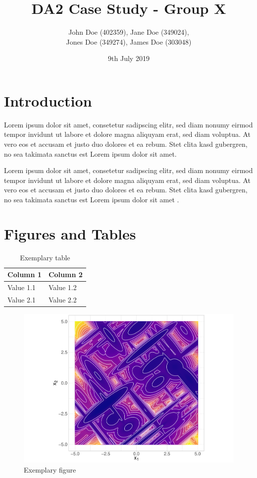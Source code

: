 \documentclass[12pt]{article}
\title{DA2 Case Study - Group X}
\author{John Doe (402359), Jane Doe (349024),\\ Jones Doe (349274), James Doe (303048)}
\date{9th July 2019}
\begin{document}
\maketitle

\section{Introduction}
Lorem ipsum dolor sit amet, consetetur sadipscing elitr, sed diam nonumy eirmod tempor invidunt ut labore et dolore magna aliquyam erat, sed diam voluptua. At vero eos et accusam et justo duo dolores et ea rebum. Stet clita kasd gubergren, no sea takimata sanctus est Lorem ipsum dolor sit amet.

Lorem ipsum dolor sit amet, consetetur sadipscing elitr, sed diam nonumy eirmod tempor invidunt ut labore et dolore magna aliquyam erat, sed diam voluptua. At vero eos et accusam et justo duo dolores et ea rebum. Stet clita kasd gubergren, no sea takimata sanctus est Lorem ipsum dolor sit amet \cite{eiben2015intro}.

\section{Figures and Tables}

\begin{table}[h!]
    \centering
    \begin{tabular}{@{}p{}p{}@{}}
        \hline
		{\bf Column 1} & {\bf Column 2}\\ \hline
         Value 1.1 &  Value 1.2\\
         Value 2.1 & Value 2.2 \\
         \hline
    \end{tabular}
    \caption{Exemplary table}
    \label{tab:exp_table}
\end{table}

\begin{figure}[h!]
    \centering
    \includegraphics[width=1\textwidth]{figures/example_figure.pdf}
    \caption{Exemplary figure}
    \label{fig:exp_figure}
\end{figure}
\end{document}
